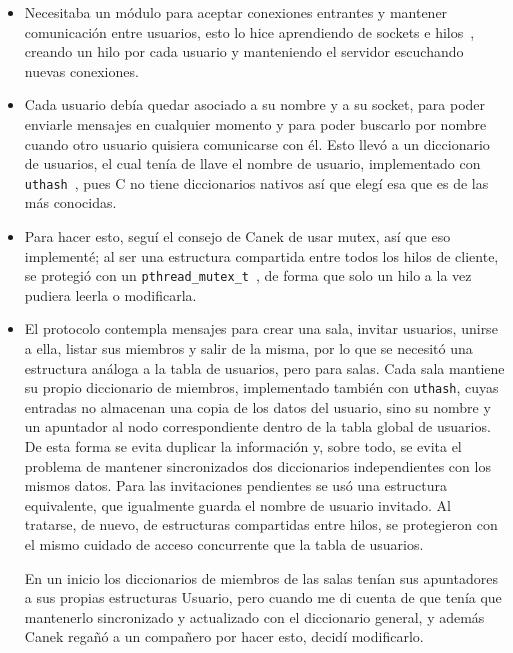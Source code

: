 \documentclass{article}
\begin{document}
\begin{itemize}
    \item Necesitaba un módulo para aceptar conexiones entrantes y mantener
    comunicación entre usuarios, esto lo hice aprendiendo de sockets e hilos~\cite{beej}, creando un hilo por cada usuario y manteniendo el servidor escuchando
    nuevas conexiones.

    \item Cada usuario debía quedar asociado a su nombre y a su socket, para poder
    enviarle mensajes en cualquier momento y para poder buscarlo por nombre
    cuando otro usuario quisiera comunicarse con él. Esto llevó a un diccionario
    de usuarios, el cual tenía de llave el nombre de usuario, 
    implementado con \texttt{uthash}~\cite{uthash}, pues C no tiene diccionarios nativos así que elegí esa que es de las más conocidas.

    \item Para hacer esto, seguí el consejo de Canek de usar mutex, así que eso
    implementé; al ser una estructura compartida entre todos los hilos de
    cliente, se protegió con un \texttt{pthread\_mutex\_t}~\cite{pthreads}, de forma que solo
    un hilo a la vez pudiera leerla o modificarla.

    \item El protocolo contempla mensajes para crear una sala, invitar usuarios,
    unirse a ella, listar sus miembros y salir de la misma, por lo que se
    necesitó una estructura análoga a la tabla de usuarios, pero para salas.
    Cada sala mantiene su propio diccionario de miembros, implementado también
    con \texttt{uthash}, cuyas entradas no almacenan una copia de los datos
    del usuario, sino su nombre y un apuntador al nodo correspondiente dentro
    de la tabla global de usuarios. De esta forma se evita duplicar la
    información y, sobre todo, se evita el problema de mantener sincronizados
    dos diccionarios independientes con los mismos datos. Para las
    invitaciones pendientes se usó una estructura equivalente, que igualmente
    guarda el nombre de usuario invitado. Al tratarse, de nuevo, de estructuras
    compartidas entre hilos, se protegieron con el mismo cuidado de acceso
    concurrente que la tabla de usuarios.

    En un inicio los diccionarios de miembros de las salas tenían sus
    apuntadores a sus propias estructuras Usuario, pero cuando me di cuenta de
    que tenía que mantenerlo sincronizado y actualizado con el diccionario
    general, y además Canek regañó a un compañero por hacer esto, decidí
    modificarlo.


\end{itemize}
\end{document}

